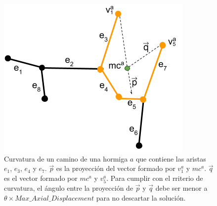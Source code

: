 \begin{figure}[h]
    \centering
    \includegraphics[scale=0.8]{imagenes/ant_curvature_case.png}
    \caption{Curvatura de un camino de una hormiga $a$ que contiene las aristas $e_1$, $e_3$, $e_4$ y $e_7$. $\Vec{p}$ es la proyecci\'on del vector formado por $v^{a}_1$ y $mc^{a}$. $\Vec{q}$ es el vector formado por $mc^{a}$ y $v^{a}_5$. Para cumplir con el rriterio de curvatura, el \'angulo entre la proyecci\'on de $\Vec{p}$ y $\Vec{q}$ debe ser menor a $\theta \times Max\_Axial\_Displacement$ para no descartar la soluci\'on. }
    \label{fig:antCurvCase}
\end{figure}

